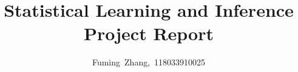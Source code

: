 \documentclass[10pt,journal,compsoc]{IEEEtran}
\begin{document}
%
\title{Statistical Learning and Inference\\Project Report}
%
%
%
%

\author{Fuming~Zhang,~118033910025
}

% 
%
\end{document}
